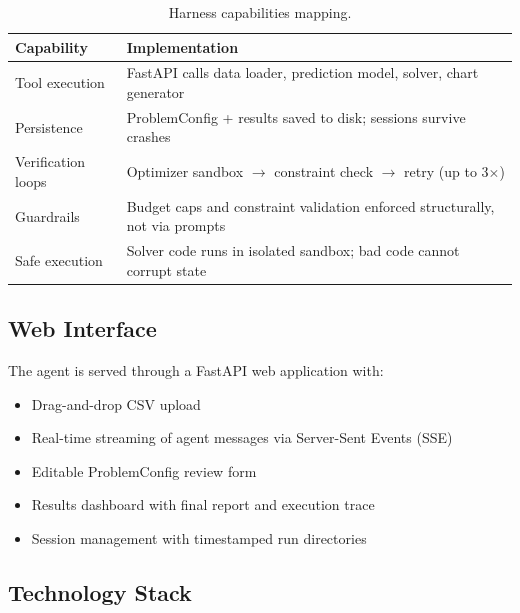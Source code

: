 \documentclass[11pt, letterpaper]{article}
\begin{document}
\begin{table}[H]
\centering
\caption{Harness capabilities mapping.}
\label{tab:harness}
\begin{tabularx}{\textwidth}{@{}lX@{}}
\toprule
\textbf{Capability} & \textbf{Implementation} \\
\midrule
Tool execution & FastAPI calls data loader, prediction model, solver, chart generator \\
Persistence & ProblemConfig + results saved to disk; sessions survive crashes \\
Verification loops & Optimizer sandbox $\to$ constraint check $\to$ retry (up to 3$\times$) \\
Guardrails & Budget caps and constraint validation enforced structurally, not via prompts \\
Safe execution & Solver code runs in isolated sandbox; bad code cannot corrupt state \\
\bottomrule
\end{tabularx}
\end{table}

\subsection{Web Interface}

The agent is served through a FastAPI web application with:
\begin{itemize}[nosep]
    \item Drag-and-drop CSV upload
    \item Real-time streaming of agent messages via Server-Sent Events (SSE)
    \item Editable ProblemConfig review form
    \item Results dashboard with final report and execution trace
    \item Session management with timestamped run directories
\end{itemize}

\subsection{Technology Stack}
\end{document}
